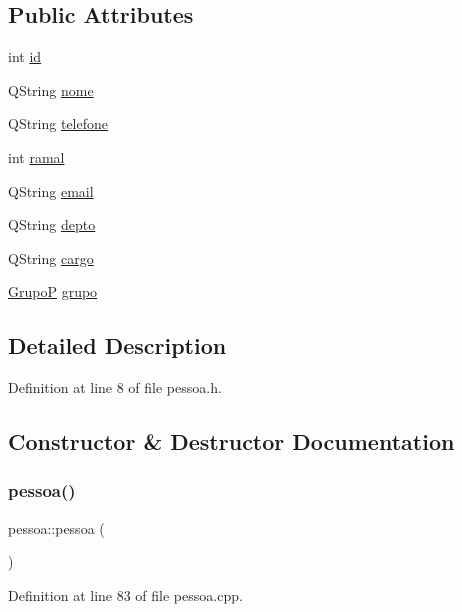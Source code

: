\subsection*{Public Attributes}
\begin{DoxyCompactItemize}
\item 
int \hyperlink{classpessoa_a8e80bd7d70d7d29b248ef5ec77720b5b}{id}
\item 
Q\+String \hyperlink{classpessoa_aa0865641711741f9da9bd6f85a4169a7}{nome}
\item 
Q\+String \hyperlink{classpessoa_a68bcc80bb08668da00068cc3e475b771}{telefone}
\item 
int \hyperlink{classpessoa_a3263ed9356bab20fb6c364483fe0d7b7}{ramal}
\item 
Q\+String \hyperlink{classpessoa_ac50713f68cf6f093f64d5d5052c1e175}{email}
\item 
Q\+String \hyperlink{classpessoa_a612f53ad664ff1afb6582ed1f8711522}{depto}
\item 
Q\+String \hyperlink{classpessoa_af788a2b8720c8368236afc3875a9fb75}{cargo}
\item 
\hyperlink{class_grupo_p}{GrupoP} \hyperlink{classpessoa_a1cc497f533336ea9451cf321d355afed}{grupo}
\end{DoxyCompactItemize}


\subsection{Detailed Description}


Definition at line 8 of file pessoa.\+h.



\subsection{Constructor \& Destructor Documentation}
\hypertarget{classpessoa_ae2ee70812ff092a18c24ed94eaae260b}{}\label{classpessoa_ae2ee70812ff092a18c24ed94eaae260b} 
\subsubsection{\texorpdfstring{pessoa()}{pessoa()}}
{\footnotesize\ttfamily pessoa\+::pessoa (\begin{DoxyParamCaption}{ }\end{DoxyParamCaption})}



Definition at line 83 of file pessoa.\+cpp.



